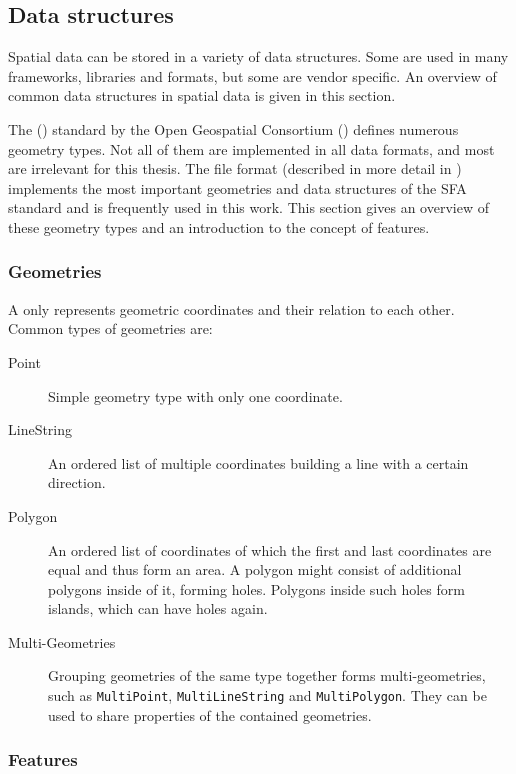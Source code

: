 	\subsection{Data structures}
	\label{subsec:data-structures}
	
		Spatial data can be stored in a variety of data structures.
		Some are used in many frameworks, libraries and formats, but some are vendor specific.
		An overview of common data structures in spatial data is given in this section.
		
		The  () standard by the Open Geospatial Consortium () defines numerous geometry types\cite{ogc-sfa}.
		Not all of them are implemented in all data formats, and most are irrelevant for this thesis.
		The  file format (described in more detail in ) implements the most important geometries and data structures of the SFA standard and is frequently used in this work.
		This section gives an overview of these geometry types and an introduction to the concept of features.
		
		\subsubsection{Geometries}
		
			A  only represents geometric coordinates and their relation to each other.
			Common types of geometries are:
			\begin{description}
				\item[Point] Simple geometry type with only one coordinate.
				\item[LineString] An ordered list of multiple coordinates building a line with a certain direction.
				\item[Polygon] An ordered list of coordinates of which the first and last coordinates are equal and thus form an area. A polygon might consist of additional polygons inside of it, forming holes. Polygons inside such holes form islands, which can have holes again.
				\item[Multi-Geometries] Grouping geometries of the same type together forms multi-geometries, such as \texttt{MultiPoint}, \texttt{MultiLineString} and \texttt{MultiPolygon}. They can be used to share properties of the contained geometries.
			\end{description}
		
		\subsubsection{Features}
		

